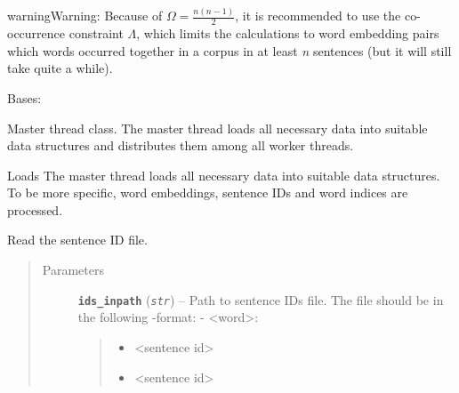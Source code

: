\documentclass[letterpaper,10pt,english]{sphinxmanual}
\begin{document}
\begin{notice}{warning}{Warning:}
Because of \(\Omega=\frac{n(n-1)}{2}\), it is recommended to use the co-occurrence constraint
\(\Lambda\), which limits the calculations to word embedding pairs which words occurred together in a corpus in
at least \emph{n} sentences (but it will still take quite a while).
\end{notice}

\begin{fulllineitems}
\label{src.mapping:src.mapping.mapthreading.MappingMasterThread}
Bases: 

Master thread class. The master thread loads all necessary data into suitable data structures and distributes
them among all worker threads.

\begin{fulllineitems}
\label{src.mapping:src.mapping.mapthreading.MappingMasterThread.prepare}
Loads The master thread loads all necessary data into suitable data structures. To be more specific,
word embeddings, sentence IDs and word indices are processed.

\end{fulllineitems}


\begin{fulllineitems}
\label{src.mapping:src.mapping.mapthreading.MappingMasterThread.read_ids_file}
Read the sentence ID file.
\begin{quote}\begin{description}
\item[{Parameters}] \leavevmode
\textbf{\texttt{ids\_inpath}} (\emph{\texttt{str}}) -- 
Path to sentence IDs file. The file should be in the following -format:
- \textless{}word\textgreater{}:
\begin{quote}
\begin{itemize}
\item {} 
\textless{}sentence id\textgreater{}

\item {} 
\textless{}sentence id\textgreater{}


\end{itemize}
\end{quote}
\end{description}
\end{quote}
\end{fulllineitems}
\end{fulllineitems}
\end{document}
